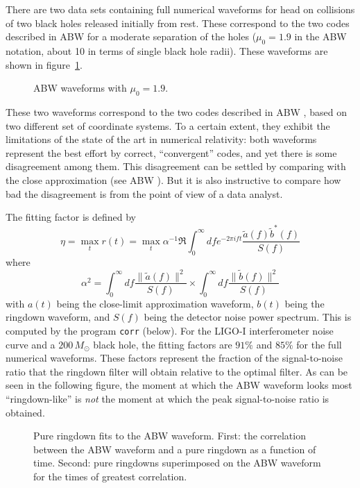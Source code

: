 There are two data sets containing full numerical waveforms for head on
collisions of two black holes released initially from rest.  These
correspond to the two codes described in ABW \cite{ABW} for a moderate separation
of the holes ($\mu_0=1.9$ in the ABW \cite{ABW} notation, about 10 in terms of
single black hole radii).  These waveforms are shown in
figure~\ref{f:ABWwaveforms}.
\begin{figure}[h]
\begin{center} 
\end{center}
\caption{\label{f:ABWwaveforms}%
  ABW waveforms with $\mu_0=1.9$.}
\end{figure}

These two waveforms correspond to the two codes described in ABW \cite{ABW}, based
on two different set of coordinate systems. To a certain extent, they 
exhibit the limitations of the state of the art in numerical relativity:
both waveforms represent the best effort by correct, ``convergent'' codes,
and yet there is some disagreement among them. This disagreement can be
settled by comparing with the close approximation (see ABW \cite{ABW}). But it is also 
instructive to compare how bad the disagreement is from the point of 
view of a data analyst.

The fitting factor is defined by
\begin{equation}
  \eta = \max_t r(t) = \max_t \alpha^{-1} \Re \int_0^\infty df e^{-2\pi ift}
    \frac{\tilde{a}(f)\tilde{b}^\ast(f)}{S(f)}
\end{equation}
where
\begin{equation}
  \alpha^2 = \int_0^\infty df \frac{\|\tilde{a}(f)\|^2}{S(f)}
    \times\int_0^\infty df \frac{\|\tilde{b}(f)\|^2}{S(f)}
\end{equation}
with $a(t)$ being the close-limit approximation waveform, $b(t)$ being the
ringdown waveform, and $S(f)$ being the detector noise power spectrum.  This
is computed by the program \texttt{corr} (below).  For the LIGO-I
interferometer noise curve and a $200\,M_\odot$ black hole, the fitting
factors are $91\%$ and $85\%$ for the full numerical waveforms.  These
factors represent the fraction of the signal-to-noise ratio that the ringdown
filter will obtain relative to the optimal filter.  As can be seen in the
following figure, the moment at which the ABW \cite{ABW} waveform looks most
``ringdown-like'' is \emph{not} the moment at which the peak signal-to-noise
ratio is obtained.
\begin{figure}[h]
\begin{center}
\end{center}
\caption{\label{f:ABWfits}%
Pure ringdown fits to the ABW waveform.  First: the correlation between the
ABW waveform and a pure ringdown as a function of time.  Second: pure
ringdowns superimposed on the ABW waveform for the times of greatest
correlation.}
\end{figure}

